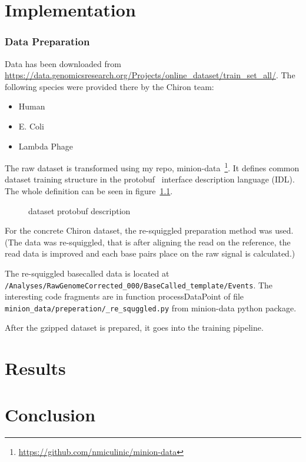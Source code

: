 \documentclass[times, utf8, diplomski, english]{fer}
\begin{document}
\chapter{Implementation}
\subsection{Data Preparation}

Data has been downloaded from \url{https://data.genomicsresearch.org/Projects/online_dataset/train_set_all/}.  The following species were provided there by the Chiron team:
\begin{itemize}
    \item Human
    \item E. Coli
    \item Lambda Phage
\end{itemize}

The raw dataset is transformed using my repo, minion-data~\footnote{\url{https://github.com/nmiculinic/minion-data}}. It defines common dataset training structure in the protobuf~\citep{protobuf} interface description language (IDL). The whole definition can be seen in figure~\ref{fg:dataset_proto}.

\begin{figure}
    \begin{center}
        
        \caption{dataset protobuf description}
        \label{fg:dataset_proto}
    \end{center}
\end{figure}

For the concrete Chiron dataset, the re-squiggled preparation method was used. (The data was re-squiggled, that is after aligning the read on the reference, the read data is improved and each base pairs place on the raw signal is calculated.)

The re-squiggled basecalled data is located at \verb|/Analyses/RawGenomeCorrected_000/BaseCalled_template/Events|. The interesting code fragments are in function processDataPoint of file \verb|minion_data/preperation/_re_squggled.py| from minion-data python package.

After the gzipped dataset is prepared, it goes into the training pipeline.

\chapter{Results}
\chapter{Conclusion}
\end{document}
